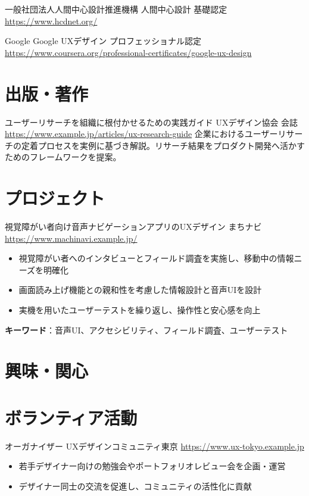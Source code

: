 \documentclass[a4paper, serif, 10pt]{moderncv}
\begin{document}
        {一般社団法人人間中心設計推進機構}
        {人間中心設計 基礎認定}
        {\url{https://www.hcdnet.org/}}
        {}
        {}

        {Google}
        {Google UXデザイン プロフェッショナル認定}
        {\url{https://www.coursera.org/professional-certificates/google-ux-design}}
        {}
        {}
\section{出版・著作}

        {ユーザーリサーチを組織に根付かせるための実践ガイド}
        {UXデザイン協会 会誌}
        {\url{https://www.example.jp/articles/ux-research-guide}}
        {}
        {企業におけるユーザーリサーチの定着プロセスを実例に基づき解説。リサーチ結果をプロダクト開発へ活かすためのフレームワークを提案。}
\section{プロジェクト}

        {視覚障がい者向け音声ナビゲーションアプリのUXデザイン}
        {まちナビ}
        {\url{https://www.machinavi.example.jp/}}
        {}
        {\begin{itemize}
\item 視覚障がい者へのインタビューとフィールド調査を実施し、移動中の情報ニーズを明確化
\item 画面読み上げ機能との親和性を考慮した情報設計と音声UIを設計
\item 実機を用いたユーザーテストを繰り返し、操作性と安心感を向上
\end{itemize}
\textbf{キーワード}：音声UI、アクセシビリティ、フィールド調査、ユーザーテスト}
\section{興味・関心}

\section{ボランティア活動}

        {オーガナイザー}
        {UXデザインコミュニティ東京}
        {\url{https://www.ux-tokyo.example.jp}}
        {}
        {\begin{itemize}
\item 若手デザイナー向けの勉強会やポートフォリオレビュー会を企画・運営
\item デザイナー同士の交流を促進し、コミュニティの活性化に貢献
\end{itemize}}
\end{document}
